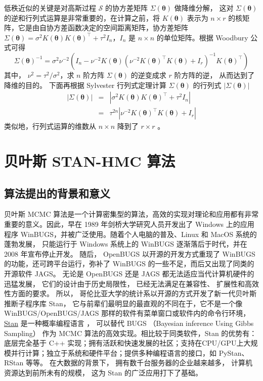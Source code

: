 \documentclass[12pt,a4paper,UTF8,twoside]{book}
\theoremstyle{definition}
\theoremstyle{definition}
\theoremstyle{definition}
\theoremstyle{remark}
\begin{document}
低秩近似的关键是对高斯过程 \(\mathcal{S}\) 的协方差矩阵
\(\Sigma(\boldsymbol{\theta})\) 做降维分解， 这对
\(\Sigma(\boldsymbol{\theta})\)
的逆和行列式运算是非常重要的，在计算之前，将 \(K(\boldsymbol{\theta})\)
表示为 \(n\times r\)
的核矩阵，它是由自协方差函数决定的空间距离矩阵，协方差矩阵
\(\Sigma(\boldsymbol{\theta}) = \sigma^2K(\boldsymbol{\theta})K(\boldsymbol{\theta})^{\top}+\tau^2 I_{n}\)，\(I_{n}\)
是 \(n\times n\) 的单位矩阵。根据 Woodbury 公式可得
\[\Sigma(\boldsymbol{\theta})^{-1} = \sigma^2\nu^{-2}(I_{n}-\nu^{-2}K(\boldsymbol{\theta})(\nu^{-2}K(\boldsymbol{\theta})^{\top} K(\boldsymbol{\theta})+I_{r})^{-1}K(\boldsymbol{\theta})^{\top})\]
其中， \(\nu^2 = \tau^2/\sigma^2\)，求 \(n\) 阶方阵
\(\Sigma(\boldsymbol{\theta})\) 的逆变成求 \(r\) 阶方阵的逆，
从而达到了降维的目的。 下面再根据 Sylvester 行列式定理计算
\(\Sigma(\boldsymbol{\theta})\) 的行列式
\(|\Sigma(\boldsymbol{\theta})|\) \begin{eqnarray*}
|\Sigma(\boldsymbol{\theta})| & = & |\sigma^2K(\boldsymbol{\theta})K(\boldsymbol{\theta})^{\top}+\tau^2 I_{n}| \\ 
                 & = & \tau^{2n}|\nu^{-2}K(\boldsymbol{\theta})^{\top} K(\boldsymbol{\theta})+I_{r}|
\end{eqnarray*} \noindent 类似地，行列式运算的维数从 \(n\times n\)
降到了 \(r\times r\) \citep{Diggle2007}。

\hypertarget{sec:stan-hmc}{%
\section{贝叶斯 STAN-HMC 算法}\label{sec:stan-hmc}}

\hypertarget{subsec:motivations}{%
\subsection{算法提出的背景和意义}\label{subsec:motivations}}

贝叶斯 MCMC
算法是一个计算密集型的算法，高效的实现对理论和应用都有非常重要的意义。因此，早在
1989 年剑桥大学研究人员开发出了 Windows 上的应用程序
WinBUGS，并被广泛使用。随着个人电脑的普及、Linux 和 MacOS
系统的蓬勃发展， 只能运行于 Windows 系统上的 WinBUGS
逐渐落后于时代，并在 2008 年宣布停止开发。 随后， OpenBUGS
以开源的开发方式重现了 WinBUGS 的功能，还可跨平台运行，弥补了 WinBUGS
的一些不足，而后又出现了同类的开源软件 JAGS。 无论是 OpenBUGS 还是 JAGS
都无法适应当代计算机硬件的迅猛发展， 它们的设计由于历史局限性，
已经无法满足在兼容性、 扩展性和高效性方面的要求。 所以，
哥伦比亚大学的统计系以开源的方式开发了新一代贝叶斯推断子程序库 Stan，
它与前辈们最明显的最直观的不同在于，它不是一个像 WinBUGS/OpenBUGS/JAGS
那样的软件有菜单窗口或软件内的命令行环境，
\href{http://mc-stan.org/}{Stan} 是一种概率编程语言
\citep{Stan2017JSS}， 可以替代 BUGS （Bayesian inference Using Gibbs
Sampling） \citep{BUGS2009} 作为 MCMC
算法的高效实现。相比较于同类软件，Stan 的优势有：底层完全基于 C++
实现；拥有活跃和快速发展的社区；支持在CPU/GPU上大规模并行计算；独立于系统和硬件平台；提供多种编程语言的接口，如
PyStan、 RStan 等等。 在大数据的背景下，
拥有数千台服务器的企业越来越多， 计算机资源达到前所未有的规模， 这为
Stan 的广泛应用打下了基础。
\end{document}
